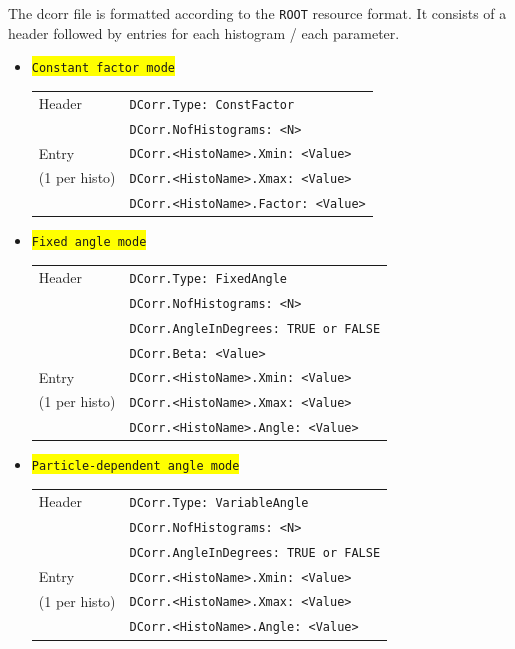 \documentclass[10pt]{article}
\newcommand{\yellow}[1]{\colorbox{yellow}{\texttt{#1}}}
\begin{document}
The dcorr file is formatted according to the \texttt{ROOT} resource format.
It consists of a header followed by entries for each histogram / each parameter.
\begin{itemize}
\setlength{\rightmargin}{1em}%
\setlength{\leftmargin}{2em}%
\setlength{\itemsep}{0pt}%
\setlength{\parskip}{1mm}%
\setlength{\partopsep}{0pt}%
\setlength{\parsep}{0pt}%
\setlength{\topsep}{0pt}%
\item	\yellow{Constant factor mode}\\
	\begin{center}
	\begin{tabular}{|l|l|}
	\hline
	Header	&	\texttt{DCorr.Type: ConstFactor}		\\
		&	\texttt{DCorr.NofHistograms: <N>}		\\
	\hline
	Entry	&	\texttt{DCorr.<HistoName>.Xmin:	<Value>}	\\
	(1 per histo) &	\texttt{DCorr.<HistoName>.Xmax:	<Value>}	\\
		&	\texttt{DCorr.<HistoName>.Factor: <Value>}	\\
	\hline
	\end{tabular}
	\end{center}
\item	\yellow{Fixed angle mode}\\
	\begin{center}
	\begin{tabular}{|l|l|}
	\hline
	Header	&	\texttt{DCorr.Type: FixedAngle}			\\
		&	\texttt{DCorr.NofHistograms: <N>}		\\
		&	\texttt{DCorr.AngleInDegrees: TRUE or FALSE}	\\
		&	\texttt{DCorr.Beta: <Value>}			\\
	\hline
	Entry	&	\texttt{DCorr.<HistoName>.Xmin:	<Value>}	\\
	(1 per histo) &	\texttt{DCorr.<HistoName>.Xmax:	<Value>}	\\
		&	\texttt{DCorr.<HistoName>.Angle: <Value>}	\\
	\hline
	\end{tabular}
	\end{center}
\item	\yellow{Particle-dependent angle mode}\\
	\begin{center}
	\begin{tabular}{|l|l|}
	\hline
	Header	&	\texttt{DCorr.Type: VariableAngle}		\\
		&	\texttt{DCorr.NofHistograms: <N>}		\\
		&	\texttt{DCorr.AngleInDegrees: TRUE or FALSE}	\\
	\hline
	Entry	&	\texttt{DCorr.<HistoName>.Xmin:	<Value>}	\\
	(1 per histo) &	\texttt{DCorr.<HistoName>.Xmax:	<Value>}	\\
		&	\texttt{DCorr.<HistoName>.Angle: <Value>}	\\
	\hline
	\end{tabular}
	\end{center}
\end{itemize}
\end{document}
